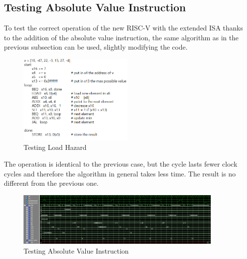 \subsection{Testing Absolute Value Instruction}
\label{subs:testAbs}
To test the correct operation of the new RISC-V with the extended ISA thanks to the addition of the absolute value instruction, the same algorithm as in the previous subsection can be used, slightly modifying the code.
\begin{figure}[H]
	\centering
	\includegraphics[width=0.5\textwidth]{sec3/images/test9.png}
	\caption{Testing Load Hazard}
	\label{fig:test9}
\end{figure}
\noindent The operation is identical to the previous case, but the cycle lasts fewer clock cycles and therefore the algorithm in general takes less time. The result is no different from the previous one.
\begin{figure}[H]
	\centering
	\includegraphics[width=0.9\textwidth]{sec3/images/wave_test9_1.png}
	\caption{Testing Absolute Value Instruction}
	\label{fig:wavetest9}
\end{figure}